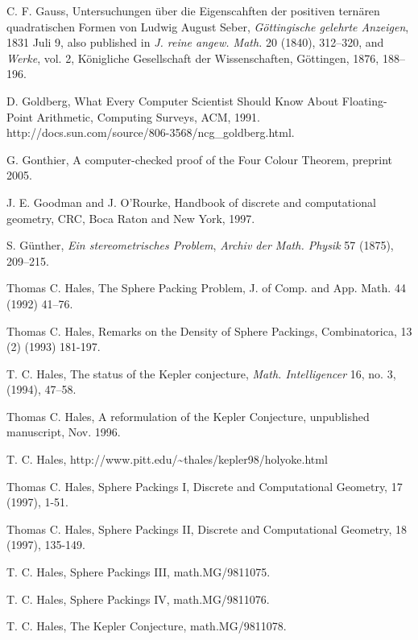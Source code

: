 \begin{thebibliography}{CHMS94}
 C. F. Gauss, Untersuchungen \"uber die Eigenscahften der
positiven tern\"aren quadratischen Formen von Ludwig August Seber,
    {\it G\"ottingische gelehrte Anzeigen}, 1831 Juli 9,
also published in {\it J. reine angew. Math.} 20 (1840), 312--320,
and
    {\it Werke},  vol. 2,
    K\"onigliche Gesellschaft der Wissenschaften, G\"ottingen,
            1876, 188--196.

 D. Goldberg, What Every Computer Scientist Should
Know About Floating-Point Arithmetic, Computing Surveys, ACM, 1991.
http://docs.sun.com/source/806-3568/ncg\_goldberg.html.

 G. Gonthier, A computer-checked proof of the Four
Colour Theorem, preprint 2005.

 J. E. Goodman and J. O'Rourke, Handbook of discrete and
    computational geometry, CRC, Boca Raton and New York, 1997.

 S. G\"unther, {\it Ein stereometrisches Problem},
{\it Archiv der Math. Physik} 57 (1875), 209--215.

 Thomas C. Hales, The Sphere Packing Problem, J. of Comp.
and App. Math. 44 (1992) 41--76.

 Thomas C. Hales, Remarks on the Density of Sphere Packings,
        Combinatorica, 13 (2) (1993) 181-197.

 T. C. Hales, The status of the Kepler conjecture,
    {\it Math. Intelligencer} 16, no. 3, (1994), 47--58.

 Thomas C. Hales, A reformulation of the
Kepler Conjecture, unpublished manuscript, Nov. 1996.

 T. C. Hales,
    {http://www.pitt.edu/\~\relax thales/kepler98/holyoke.html}

 Thomas C. Hales, Sphere Packings I,
    Discrete and Computational Geometry, 17 (1997), 1-51.

 Thomas C. Hales, Sphere Packings II,
    Discrete and Computational Geometry, 18 (1997), 135-149.

 T. C. Hales, Sphere Packings III, math.MG/9811075.

 T. C. Hales, Sphere Packings IV, math.MG/9811076.

 T. C. Hales, The Kepler Conjecture, math.MG/9811078.


\end{thebibliography}
